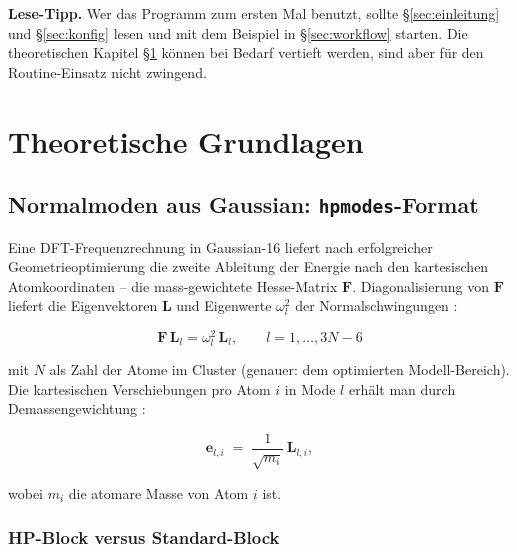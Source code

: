 \documentclass[11pt,a4paper,twoside]{article}
\newcommand{\evec}{\mathbf{e}}
\theoremstyle{remark}
\begin{document}
\begin{infobox}
\textbf{Lese-Tipp.} Wer das Programm zum ersten Mal benutzt, sollte
\S\ref{sec:einleitung} und \S\ref{sec:konfig} lesen und mit dem
Beispiel in \S\ref{sec:workflow} starten. Die theoretischen Kapitel
\S\ref{sec:theorie} k\"onnen bei Bedarf vertieft werden, sind aber f\"ur
den Routine-Einsatz nicht zwingend.
\end{infobox}

\section{Theoretische Grundlagen}
\label{sec:theorie}

\subsection{Normalmoden aus Gaussian: \texttt{hpmodes}-Format}
\label{sec:normalmoden}

Eine DFT-Frequenzrechnung in Gaussian-16 liefert nach erfolgreicher
Geometrieoptimierung die zweite Ableitung der Energie nach den
kartesischen Atomkoordinaten -- die mass-gewichtete Hesse-Matrix
$\mathbf{F}$. Diagonalisierung von $\mathbf{F}$ liefert die
Eigenvektoren $\mathbf{L}$ und Eigenwerte $\omega_l^2$ der
Normalschwingungen \cite{WilsonDeciusCross1955}:

\begin{equation}
  \mathbf{F}\,\mathbf{L}_l = \omega_l^2 \, \mathbf{L}_l ,
  \qquad l = 1, \ldots, 3N-6
  \label{eq:fg-eigenproblem}
\end{equation}

mit $N$ als Zahl der Atome im Cluster (genauer: dem optimierten
Modell-Bereich). Die kartesischen Verschiebungen pro Atom $i$ in
Mode $l$ erh\"alt man durch Demassengewichtung
\cite{WilsonDeciusCross1955}:

\begin{equation}
  \evec_{l,i} \;=\; \frac{1}{\sqrt{m_i}}\,\mathbf{L}_{l,i} ,
  \label{eq:demass}
\end{equation}

wobei $m_i$ die atomare Masse von Atom $i$ ist.

\subsubsection*{HP-Block versus Standard-Block}
\end{document}
